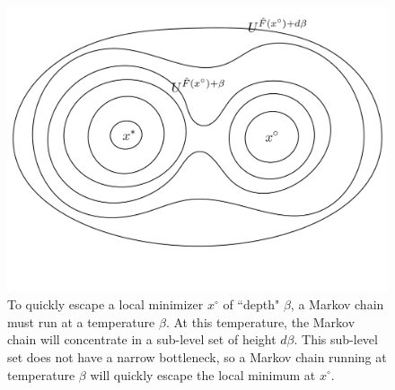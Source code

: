 \documentclass[final,12pt]{colt2018} %
\begin{document}
{\begin{figure}[H]
\begin{center}
\includegraphics[trim={0 4cm 0 0}, clip, scale=0.3]{level_sets}
\end{center}
\caption{To quickly escape a local minimizer $x^\circ$ of ``depth" $\beta$, a Markov chain must run at a temperature $\beta$.  At this temperature, the Markov chain will concentrate in a sub-level set of height $d\beta$. This sub-level set does not have a narrow bottleneck, so a Markov chain running at temperature $\beta$ will quickly escape the local minimum at $x^\circ$.}\label{fig:level_sets}
%
%
%
%
\end{figure}


}
\end{document}
